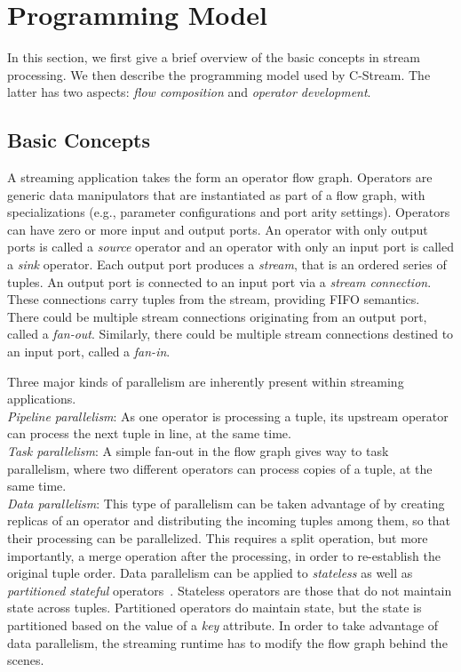 \section{Programming Model}\label{sec:pmodel}
In this section, we first give a brief overview of the basic concepts in
stream processing. We then describe the programming model used by C-Stream.
The latter has two aspects: \emph{flow composition} and \emph{operator
development}.

\subsection{Basic Concepts}
A streaming application takes the form an operator flow graph. Operators are
generic data manipulators that are instantiated as part of a flow graph, with
specializations (e.g., parameter configurations and port arity settings).
Operators can have zero or more input and output ports. An operator with only
output ports is called a \emph{source} operator and an operator with only an
input port is called a \emph{sink} operator. Each output port produces a
\emph{stream}, that is an ordered series of tuples. An output port is
connected to an input port via a \emph{stream connection}. These connections
carry tuples from the stream, providing FIFO semantics. There could be
multiple stream connections originating from an output port, called a
\emph{fan-out}. Similarly, there could be multiple stream connections destined
to an input port, called a \emph{fan-in}.

Three major kinds of parallelism are inherently present within streaming
applications.
\medskip\\
\noindent\emph{Pipeline parallelism}: As one operator is processing a tuple, its
upstream operator can process the next tuple in line, at the same time.
\medskip\\
\noindent\emph{Task parallelism}: A simple fan-out in the flow graph gives way
to task parallelism, where two different operators can process 
copies of a tuple, at the same time.
\medskip\\
\noindent\emph{Data parallelism}: This type of parallelism can be taken advantage
of by creating replicas of an operator and distributing the incoming tuples
among them, so that their processing can be parallelized. This requires a
split operation, but more importantly, a merge operation after the processing,
in order to re-establish the original tuple order. Data parallelism can be applied
to \emph{stateless} as well as
\emph{partitioned stateful} operators~\cite{ref:elastic-parallel}. Stateless
operators are those that do not maintain state across tuples. Partitioned
operators do maintain state, but the state is partitioned based on the value
of a \emph{key} attribute. In order to take advantage of data parallelism, the
streaming runtime has to modify the flow graph behind the scenes.

